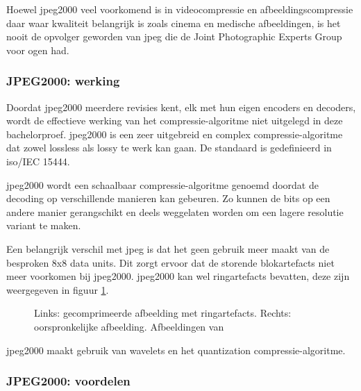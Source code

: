 Hoewel \gls{jpeg2000} veel voorkomend is in \gls{videocompressie} en \gls{afbeeldingscompressie} daar waar kwaliteit belangrijk is zoals cinema en medische afbeeldingen, is het nooit de opvolger geworden van \gls{jpeg} die de Joint Photographic Experts Group voor ogen had.


\subsubsection{JPEG2000: werking}
\label{sec:afbeeldingscompressie-jpeg2000-werking}

Doordat \gls{jpeg2000} meerdere revisies kent, elk met hun eigen \glspl{encoder} en \glspl{decoder}, wordt de effectieve werking van het \gls{compressie-algoritme} niet uitgelegd in deze bachelorproef. \Gls{jpeg2000} is een zeer uitgebreid en complex \gls{compressie-algoritme} dat zowel \gls{lossless} als \gls{lossy} te werk kan gaan. De standaard is gedefinieerd in \gls{iso}/IEC 15444.

\Gls{jpeg2000} wordt een schaalbaar \gls{compressie-algoritme} genoemd doordat de \gls{decoding} op verschillende manieren kan gebeuren. Zo kunnen de \glspl{bit} op een andere manier gerangschikt en deels weggelaten worden om een lagere resolutie variant te maken.

Een belangrijk verschil met \gls{jpeg} is dat het geen gebruik meer maakt van de besproken 8x8 data units. Dit zorgt ervoor dat de storende blok\glspl{artefact} niet meer voorkomen bij \gls{jpeg2000}. \Gls{jpeg2000} kan wel ring\glspl{artefact} bevatten, deze zijn weergegeven in figuur \ref{fig:ring-artefact}.

\begin{figure}
	\centering
	\caption{Links: gecomprimeerde afbeelding met ring\glspl{artefact}. Rechts: oorspronkelijke afbeelding. Afbeeldingen van \cite{ringartefact}}
	\label{fig:ring-artefact}
\end{figure}

\gls{jpeg2000} maakt gebruik van \glspl{wavelet} en het quantization \gls{compressie-algoritme}.

\subsubsection{JPEG2000: voordelen}
\label{sec:afbeeldingscompressie-jpeg2000-voordelen}

